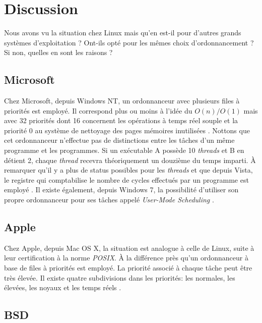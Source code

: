 \documentclass[letterpaper]{article}
\begin{document}
\section{Discussion}

Nous avons vu la situation chez Linux mais qu'en est-il pour d'autres grands systèmes d'exploitation ? Ont-ils opté pour les mêmes choix d'ordonnancement ? Si non, quelles en sont les raisons ?

\subsection{Microsoft}

Chez Microsoft, depuis Windows NT, un ordonnanceur avec plusieurs files à priorités est employé. Il correspond plus ou moins à l'idée du $O(n) / O(1)$ mais avec 32 priorités dont 16 concernent les opérations à temps réel souple et la priorité 0 au système de nettoyage des pages mémoires inutilisées \citep{jones1999cpu}. Nottons que cet ordonnanceur n'effectue pas de distinctions entre les tâches d'un même programme et les programmes. Si un exécutable A possède 10 \textit{threads} et B en détient 2, chaque \textit{thread} recevra théoriquement un douzième du temps imparti. À remarquer qu'il y a plus de status possibles pour les \textit{threads} et que depuis Vista, le registre qui comptabilise le nombre de cycles effectués par un programme est employé \citep{Russinovich:2009:WII:1717352}. Il existe également, depuis Windows 7, la possibilité d'utiliser son propre ordonnanceur pour ses tâches appelé \textit{User-Mode Scheduling} \citep{UMS}.

\subsection{Apple}

Chez Apple, depuis Mac OS X, la situation est analogue à celle de Linux, suite à leur certification à la norme \textit{POSIX}. À la différence près qu'un ordonnanceur à base de files à priorités est employé. La priorité associé à chaque tâche peut être très élevée. Il existe quatre subdivisions dans les priorités: les normales, les élevées, les noyaux et les temps réels \citep{singh2006mac}.

\subsection{BSD}
\end{document}
